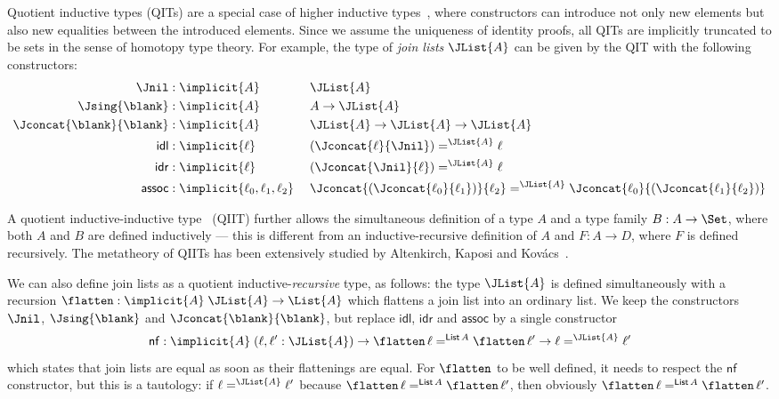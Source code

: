 \documentclass[a4paper,UKenglish,numberwithinsect,cleveref,thm-restate]{lipics-v2021}
\begin{document}
Quotient inductive types (QITs) are a special case of higher inductive types~\cite{Lumsdaine2020}, where constructors can introduce not only new elements but also new equalities between the introduced elements.
%
Since we assume the uniqueness of identity proofs, all QITs are implicitly truncated to be sets in the sense of homotopy type theory.
%
For example, the type of \emph{join lists} $\JList{A}$ can be given by the QIT
with the following constructors:
\begin{alignat*}{3}
  \Jnil                    & : \implicit{A}      && \JList{A} \\
  \Jsing{\blank}           & : \implicit{A}      && A \to \JList{A} \\
  \Jconcat{\blank}{\blank} & : \implicit{A}      && \JList{A} \to \JList{A} \to \JList{A} \\
  \mathsf{idl}             & : \implicit{\ell}\; && (\Jconcat{\ell}{\Jnil}) =^{\JList{A}} \ell \\
  \mathsf{idr}             & : \implicit{\ell}\; && (\Jconcat{\Jnil}{\ell}) =^{\JList{A}} \ell \\
  \mathsf{assoc}           & : \implicit{\ell_0, \ell_1, \ell_2}\; && \Jconcat{(\Jconcat{\ell_0}{\ell_1})}{\ell_2} =^{\JList{A}} \Jconcat{\ell_0}{(\Jconcat{\ell_1}{\ell_2})}
\end{alignat*}


A quotient inductive-inductive type~\cite{Altenkirch2018} (QIIT) further allows the simultaneous definition of a type $A$ and a type family $B : A \to \Set$, where both $A$ and $B$ are defined inductively --- this is different from an inductive-recursive definition of $A$ and $F : A \to D$, where $F$ is defined recursively.
The metatheory of QIITs has been extensively studied by Altenkirch, Kaposi and Kov\'acs~\cite{Kaposi2018,Kaposi2019,Kovacs2020}.

We can also define join lists as a quotient inductive-\emph{recursive} type, as follows: the type $\JList{A}$ is defined simultaneously with a recursion $\flatten : \implicit{A}\;\JList{A} \to \List{A}$ which flattens a join list into an ordinary list. We keep the constructors $\Jnil$, $\Jsing{\blank}$ and $\Jconcat{\blank}{\blank}$, but replace $\mathsf{idl}$, $\mathsf{idr}$ and $\mathsf{assoc}$ by a single constructor
\[
  \mathsf{nf} : \implicit{A}\;(\ell, \ell' : \JList{A}) \to \flatten\,\ell =^{\mathsf{List}\,A} \flatten\,\ell' \to \ell =^{\JList{A}} \ell'
\]
which states that join lists are equal as soon as their flattenings are equal. For $\flatten$ to be well defined, it needs to respect the $\mathsf{nf}$ constructor, but this is a tautology: if $\ell =^{\JList{A}} \ell'$ because $\flatten\,\ell =^{\mathsf{List}\,A} \flatten\,\ell'$, then obviously $\flatten\,\ell =^{\mathsf{List}\,A} \flatten\,\ell'$.
\end{document}
